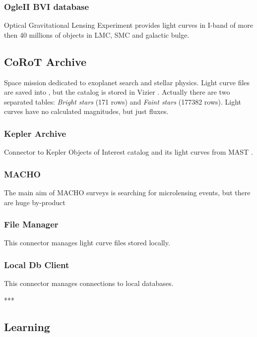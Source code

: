 \documentclass[final,5p,times,twocolumn,authoryear]{elsarticle}
\begin{document}
\subsubsection*{OgleII BVI database}

Optical Gravitational Lensing Experiment provides light curves in I-band of more then 40 millions of objects in LMC, SMC and galactic bulge.

\subsection*{CoRoT Archive}

Space mission dedicated to exoplanet search and stellar physics. Light curve files are saved into \cite{CoRoT}, but the catalog is stored in Vizier \cite{vizier}. Actually there are two separated tables: \textit{Bright stars} (171 rows) and \textit{Faint stars} (177382 rows). Light curves have no calculated magnitudes, but just fluxes. 

\subsubsection*{Kepler Archive}

Connector to Kepler Objects of Interest catalog \cite{kepler} and its light curves from MAST \cite{mast}. 

\subsubsection*{MACHO}

The main aim of MACHO surveys is searching for microlensing events, but there are huge by-product

\subsubsection*{File Manager}

This connector manages light curve files stored locally.

\subsubsection*{Local Db Client}

This connector manages connections to local databases. 

***

\subsection{ Learning }
\label{ learning_sec }
\end{document}
